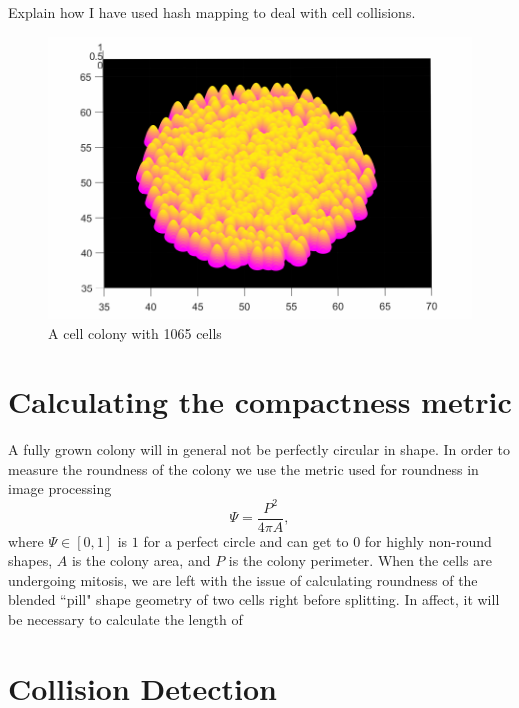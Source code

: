 Explain how I have used hash mapping to deal with cell collisions.

\begin{figure}[!htb] %
\centering
\includegraphics[width=1\textwidth]{chapter1/figures/ColonySimulationDemoNutrientField_N_1065.pdf}
\caption{A cell colony with 1065 cells }
\label{fig:ColonySimulationNutrientFieldN210}
\end{figure}
\filbreak



\section{Calculating the compactness metric}
A fully grown colony will in general not be perfectly circular in shape. In order to measure the roundness of the colony we use the metric used for roundness in image processing
\begin{equation}
    \Psi = \frac{P^2}{4 \pi A},
\end{equation}
where $\Psi \in [0,1]$ is $1$ for a perfect circle and can get to $0$ for highly non-round shapes, $A$ is the colony area, and $P$ is the colony perimeter. When the cells are undergoing mitosis, we are left with the issue of calculating roundness of the blended ``pill" shape geometry of two cells right before splitting. In affect, it will be necessary to calculate the length of 


\section{Collision Detection}

